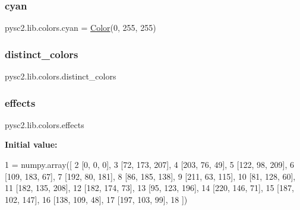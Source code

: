 \mbox{\label{namespacepysc2_1_1lib_1_1colors_a617105e0d36f090c7b3746655fcf904e}} 
\subsubsection{\texorpdfstring{cyan}{cyan}}
{\footnotesize\ttfamily pysc2.\+lib.\+colors.\+cyan = \mbox{\hyperlink{classpysc2_1_1lib_1_1colors_1_1_color}{Color}}(0, 255, 255)}

\mbox{\label{namespacepysc2_1_1lib_1_1colors_ae31c7c64f1ab70352f47c7e6fe7a1124}} 
\subsubsection{\texorpdfstring{distinct\+\_\+colors}{distinct\_colors}}
{\footnotesize\ttfamily pysc2.\+lib.\+colors.\+distinct\+\_\+colors}

\mbox{\label{namespacepysc2_1_1lib_1_1colors_ac5b107d158a7a27a2c746e740761e34a}} 
\subsubsection{\texorpdfstring{effects}{effects}}
{\footnotesize\ttfamily pysc2.\+lib.\+colors.\+effects}

{\bfseries Initial value\+:}
\begin{DoxyCode}
1 =  numpy.array([
2     [0, 0, 0],
3     [72, 173, 207],
4     [203, 76, 49],
5     [122, 98, 209],
6     [109, 183, 67],
7     [192, 80, 181],
8     [86, 185, 138],
9     [211, 63, 115],
10     [81, 128, 60],
11     [182, 135, 208],
12     [182, 174, 73],
13     [95, 123, 196],
14     [220, 146, 71],
15     [187, 102, 147],
16     [138, 109, 48],
17     [197, 103, 99],
18 ])
\end{DoxyCode}
\mbox{\label{namespacepysc2_1_1lib_1_1colors_a64e6bc776ebb60cd772930d20e8c6546}} 
